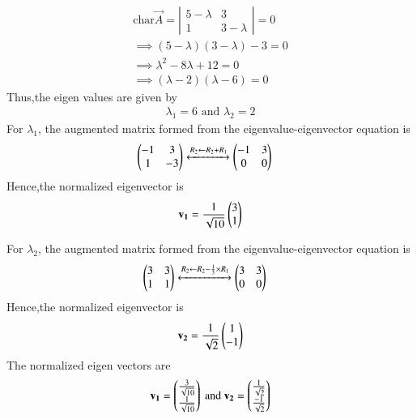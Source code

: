\documentclass[journal]{IEEEtran}
\begin{document}
\begin{align}
    \text{char}\vec{A}=\left|
\begin{array}{cc}
5-\lambda & 3 \\[6pt]
1 & 3  -\lambda
\end{array}
\right|=0\\
\implies (5- \lambda)( 3- \lambda)-3=0\\
\implies \lambda ^2-8\lambda +12=0\\
\implies (\lambda -2)(\lambda -6)=0
\end{align}
Thus,the eigen values are given by  
\begin{align}
    \lambda_1=6 \text{ and } \lambda_2=2
\end{align}
For $\lambda_1$, the augmented matrix formed from the eigenvalue-eigenvector equation is 
\begin{align}
    \begin{pmatrix}
        -1 & 3\\
        1 & -3
    \end{pmatrix}  &\xleftrightarrow{R_2 \leftarrow R_2 + R_1} \begin{pmatrix}
        -1 & 3\\
        0 & 0
    \end{pmatrix}
\end{align}
Hence,the normalized eigenvector is
\begin{align}
    \mathbf{v_1}=\frac{1}{\sqrt{10}}\begin{pmatrix}3\\1\end{pmatrix}
\end{align}

For $\lambda_2$, the augmented matrix formed from the eigenvalue-eigenvector equation is 
\begin{align}
    \begin{pmatrix}
        3 & 3\\
        1 & 1
    \end{pmatrix}  &\xleftrightarrow{R_2 \leftarrow R_2 - \frac{1}{3} \times R_1} \begin{pmatrix}
        3 & 3\\
        0 & 0
    \end{pmatrix}
\end{align}
Hence,the normalized eigenvector is
\begin{align}
    \mathbf{v_2}=\frac{1}{\sqrt{2}}\begin{pmatrix}1\\-1\end{pmatrix}
\end{align}
The normalized eigen vectors are 
\begin{align}
    \mathbf{v_1}=\begin{pmatrix}\frac{3}{\sqrt{10}}\\ \frac{1}{\sqrt{10}}\end{pmatrix} \text{ and }\mathbf{v_2}=\begin{pmatrix}\frac{1}{\sqrt{2}}\\ \frac{-1}{\sqrt{2}}\end{pmatrix}
\end{align}
\end{document}
